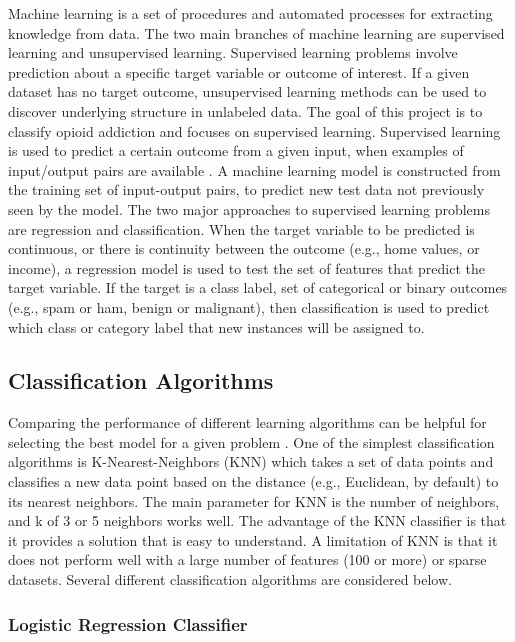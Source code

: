 \documentclass[sigconf]{acmart}
\begin{document}
Machine learning is a set of procedures and automated processes for extracting 
knowledge from data. The two main branches of machine learning are supervised 
learning and unsupervised learning. Supervised learning problems involve 
prediction about a specific target variable or outcome of interest. If a given 
dataset has no target outcome, unsupervised learning methods can be used to 
discover underlying structure in unlabeled data. The goal of this project is 
to classify opioid addiction and focuses on supervised learning. Supervised 
learning is used to predict a certain outcome from a given input, when examples 
of input/output pairs are available \cite{muller17}. A machine learning model 
is constructed from the training set of input-output pairs, to predict new test 
data not previously seen by the model. The two major approaches to supervised 
learning problems are regression and classification. When the target variable 
to be predicted is continuous, or there is continuity between the outcome 
(e.g., home values, or income), a regression model is used to test the set of 
features that predict the target variable. If the target is a class label, set 
of categorical or binary outcomes (e.g., spam or ham, benign or malignant), 
then classification is used to predict which class or category 
label that new instances will be assigned to.

\subsection{Classification Algorithms} 

Comparing the performance of different learning algorithms can be helpful for 
selecting the best model for a given problem \cite{raschka17}. One of the 
simplest classification algorithms is K-Nearest-Neighbors (KNN) which takes 
a set of data points and classifies a new data point based on the distance 
(e.g., Euclidean, by default) to its nearest neighbors. The main parameter for
KNN is the number of neighbors, and k of 3 or 5 neighbors works well. The 
advantage of the KNN classifier is that it provides a solution that is easy to 
understand. A limitation of KNN is that it does not perform well with a large 
number of features (100 or more) or sparse datasets. Several different 
classification algorithms are considered below.

\subsubsection{Logistic Regression Classifier}
\end{document}

